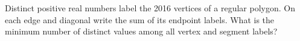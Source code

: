 Distinct positive real numbers label the 2016 vertices of a regular polygon. On each edge and diagonal write the sum of its endpoint labels. What is the minimum number of distinct values among all vertex and segment labels?
